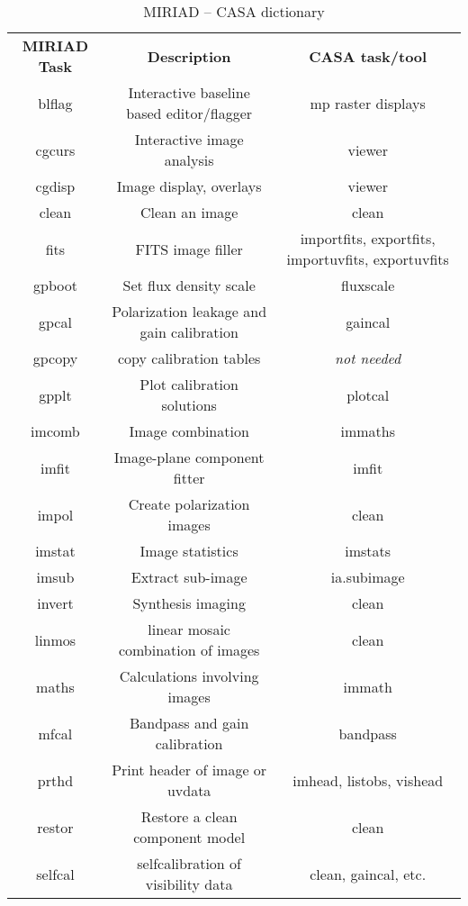 \begin{table}[ht] \footnotesize
\caption[MIRIAD -- CASA dictionary]
        {\label{table:miriad}MIRIAD -- CASA dictionary}
\begin{center}
\begin{tabular}{|c|c|c|} \hline
{\bf MIRIAD Task} &  {\bf Description}     &  {\bf CASA task/tool}   \\
  blflag  &  Interactive baseline based editor/flagger  &  mp raster displays\\
  cgcurs  &  Interactive image analysis    &  viewer \\ 
  cgdisp  &  Image display, overlays       &  viewer  \\
  clean   &  Clean an image                &  clean   \\
  fits    &  FITS image filler             &  importfits, exportfits,
  importuvfits, exportuvfits \\  
  gpboot  &  Set flux density scale        &  fluxscale  \\
  gpcal   &  Polarization leakage and gain calibration  &  gaincal  \\
  gpcopy  &  copy calibration tables       &  {\it not needed} \\
  gpplt   &  Plot calibration solutions    &  plotcal  \\
  imcomb  &  Image combination             &  immaths   \\
  imfit   &  Image-plane component fitter  & imfit  \\
  impol   &  Create polarization images    &  clean   \\
  imstat  &  Image statistics              &  imstats  \\
  imsub   &  Extract sub-image             &  ia.subimage   \\
  invert  &  Synthesis imaging             &  clean  \\
  linmos  &  linear mosaic combination of images  &  clean  \\
  maths   &  Calculations involving images  &   immath \\ 
  mfcal   &  Bandpass and gain calibration  &  bandpass \\
  prthd   &  Print header of image or uvdata  &  imhead, listobs, vishead  \\
  restor  &  Restore a clean component model  &  clean \\
  selfcal &  selfcalibration of visibility data  & clean, gaincal, etc.\\ 
\hline
\end{tabular}
\end{center}
\end{table}
\normalsize

